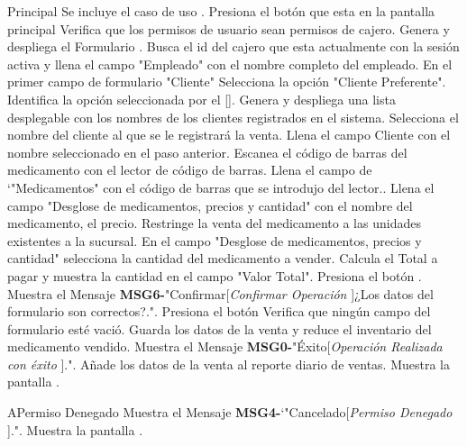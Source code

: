 	\begin{UCtrayectoria}{Principal}
		\UCpaso Se incluye el caso de uso .
		\UCpaso [\UCactor] Presiona el botón  que esta en la pantalla principal 
		\UCpaso Verifica que los permisos de usuario sean permisos de cajero. 
		\UCpaso Genera y despliega el Formulario .
		\UCpaso Busca el id del cajero que esta actualmente con la sesión activa y llena el campo "Empleado" con el nombre completo del empleado.
		\UCpaso [\UCactor] En el primer campo de formulario "Cliente" Selecciona la opción "Cliente Preferente".
		\UCpaso Identifica la opción seleccionada por el [\UCactor].
		\UCpaso Genera y despliega una lista desplegable con los nombres de los clientes registrados en el sistema.
		\UCpaso [\UCactor] Selecciona el nombre del cliente al que se le registrará la venta.
		\UCpaso Llena el campo Cliente con el nombre seleccionado en el paso anterior. 
		\UCpaso [\UCactor] Escanea el código de barras del medicamento con el lector de código de barras.
		\UCpaso Llena el campo de `"Medicamentos" con el código de barras que se introdujo del lector..
		\UCpaso Llena el campo "Desglose de medicamentos, precios y cantidad" con el nombre del medicamento, el precio.
		\UCpaso Restringe la venta del medicamento a las unidades existentes a la sucursal.
		\UCpaso [\UCactor] En el campo "Desglose de medicamentos, precios y cantidad" selecciona la cantidad del medicamento a vender.
		\UCpaso Calcula el Total a pagar y muestra la cantidad en el campo "Valor Total".
		\UCpaso [\UCactor] Presiona el botón .
		\UCpaso Muestra el Mensaje {\bf MSG6-}"Confirmar[{\em Confirmar Operación }]¿Los datos del formulario son correctos?.".
		\UCpaso [\UCactor] Presiona el botón 
		\UCpaso Verifica que ningún campo del formulario esté vació. 
		\UCpaso Guarda los datos de la venta y reduce el inventario del medicamento vendido.
		\UCpaso Muestra el Mensaje {\bf MSG0-}"Éxito[{\em Operación Realizada con éxito }].".
		\UCpaso Añade los datos de la venta al reporte diario de ventas.
		\UCpaso Muestra la pantalla .
	\end{UCtrayectoria}

	\begin{UCtrayectoriaA}{A}{Permiso Denegado}
			\UCpaso Muestra el Mensaje {\bf MSG4-}`"Cancelado[{\em Permiso Denegado }].".
			\UCpaso Muestra la pantalla .
		\end{UCtrayectoriaA}

